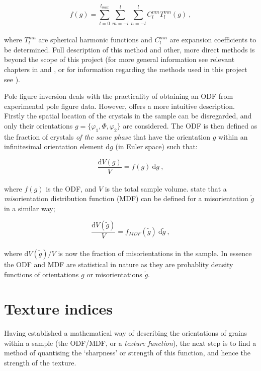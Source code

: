 \documentclass[a4paper,12pt,twoside]{report}
\numberwithin{equation}{chapter}
\begin{document}
\begin{equation} \label{eq:series_exp}
f(g) = \sum_{l=0}^{l_{max}} \sum_{m=-l}^l \sum_{n=-l}^l C_l^{mn} T_l^{mn} (g) \ ,
\end{equation}
\\
where $T_l^{mn}$ are spherical harmonic functions and $C_l^{mn}$ are expansion coefficients to be determined. Full description of this method and other, more direct methods is beyond the scope of this project (for more general information see relevant chapters in \cite{bunge1982texture,Bunge1985} and \cite{Randle2000}, or for information regarding the methods used in this project see \cite{Hielscher2008}).

Pole figure inversion deals with the practicality of obtaining an ODF from experimental pole figure data. However, \cite{bunge1982texture} offers a more intuitive description. Firstly the spatial location of the crystals in the sample can be disregarded, and only their orientations $g = \{\varphi_1,\Phi,\varphi_2\}$ are considered. The ODF is then defined as the fraction of crystals \emph{of the same phase} that have the orientation $g$ within an infinitesimal orientation element $\mathrm{d}g$ (in Euler space) such that: 



\begin{equation}
\frac{\mathrm{d}V(g)}{V} = f(g)\ \mathrm{d}g\ ,
\end{equation}
\\
where $f(g)$ is the ODF, and $V$ is the total sample volume. \cite{Mainprice} state that a \emph{mis}orientation distribution function (MDF) can be defined for a misorientation $\tilde{g}$ in a similar way;




\begin{equation}
\frac{\mathrm{d}V(\tilde{g})}{V} = f_{MDF}(\tilde{g})\ \mathrm{d}\tilde{g}\ ,
\end{equation}
\\
where $\mathrm{d}V(\tilde{g})/V$ is now the fraction of misorientations in the sample. In essence the ODF and MDF are statistical in nature as they are probablity density functions of orientations $g$ or misorientations $\tilde{g}$. 


\section{Texture indices} \label{sec:indicies}
Having established a mathematical way of describing the orientations of grains within a sample (the ODF/MDF, or a \emph{texture function}), the next step is to find a method of quantising the \lq{}sharpness\rq{} or strength of this function, and hence the strength of the texture.
\end{document}
